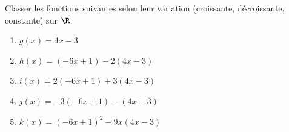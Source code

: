 \begin{exo}{}
	Classer les fonctions suivantes selon leur variation (croissante, décroissante, constante) sur $\R$.
	\begin{enumerate}
		\item $g(x) = 4x - 3$
		\item $h(x) = (-6x + 1) - 2(4x - 3)$
		\item $i(x) = 2(-6x + 1) + 3(4x - 3)$
		\item $j(x) = -3(-6x + 1) - (4x - 3)$
		\item $k(x) = (-6x + 1)^2 - 9x(4x - 3)$
	\end{enumerate}
\end{exo}
